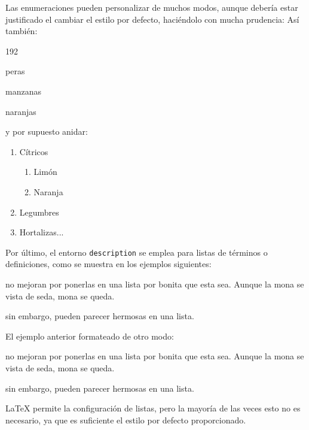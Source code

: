 \documentclass[11pt,a4paper]{article}
\begin{document}
\noindent Las enumeraciones pueden personalizar de muchos modos, aunque debería estar justificado el cambiar el estilo por defecto, haciéndolo con mucha prudencia:
\noindent Así también:

\begin{dingautolist}{192} %
	\item peras
	\item manzanas
	\item naranjas
\end{dingautolist}






\noindent y por supuesto anidar:

\begin{enumerate}
  \item Cítricos
  \begin{enumerate}
    \item Limón
    \item Naranja
  \end{enumerate}
  \item Legumbres
  \item Hortalizas...
\end{enumerate}


\noindent Por último, el entorno {\tt description} se emplea para listas de términos o definiciones, como se muestra en los ejemplos siguientes:

\begin{description}[noitemsep]
	\item[Estupideces] no mejoran por ponerlas en una lista por bonita que esta sea. Aunque la mona se vista de seda, mona se queda.
	\item[Lucideces] sin embargo, pueden parecer hermosas en
	una lista.
\end{description}

\noindent El ejemplo anterior formateado de otro modo:

\begin{description}[style=nextline]
	\item[Estupideces] no mejoran por ponerlas en una lista por bonita que esta sea. Aunque la mona se vista de seda, mona se queda.
	\item[Lucideces] sin embargo, pueden parecer hermosas en una lista.
\end{description}

\LaTeX{} permite la configuración de listas, pero la mayoría de las veces esto no es necesario, ya que es suficiente el estilo por defecto proporcionado.
\end{document}
